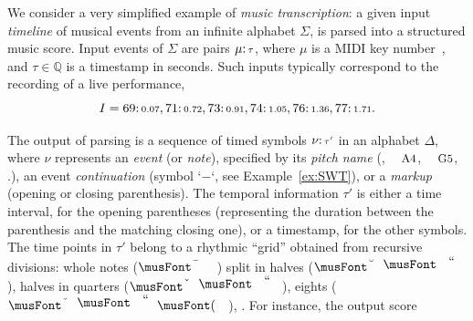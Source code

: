         
\begin{example}%
\label{ex:running}
We consider a very simplified %
example of \emph{music transcription}:
a given input \emph{timeline} of musical events
from an infinite alphabet $\Sigma$,
is parsed into a structured music score.
Input events of $\Sigma$
are pairs $\mu \mathpunct{:}{\scriptstyle \tau}$, where $\mu$ is a
MIDI key number~\cite{Selfridge-Field97beyondMIDI}, %
and $\tau \in \mathbb{Q}$ is a timestamp in seconds.
Such inputs typically correspond
to the recording of a live performance, \eg 
\[I = 69\mathpunct{:}{\scriptstyle 0.07},
      71\mathpunct{:}{\scriptstyle 0.72},
      73\mathpunct{:}{\scriptstyle 0.91},
	  74\mathpunct{:}{\scriptstyle 1.05},
	  76\mathpunct{:}{\scriptstyle 1.36},
	  77\mathpunct{:}{\scriptstyle 1.71}.\] %

The output of parsing is a sequence of
timed symbols $\nu\mathpunct{:}{\scriptstyle \tau'}$ in an alphabet $\Delta$,
where $\nu$  represents
an \emph{event} (or \emph{note}),
specified by its \emph{pitch name}
(\eg, $\mbox{\footnotesize A4}$, $\mbox{\footnotesize G5}$, \etc.),
an event \emph{continuation} (symbol `$-$`, see Example~\ref{ex:SWT}),
or a \emph{markup} (opening or closing parenthesis). %
The temporal information $\tau'$ 
is either a time interval, for the opening parentheses
(representing the duration between the parenthesis 
 and the matching closing one), 
or a timestamp, for the other symbols.
The time points in $\tau'$ belong to a rhythmic ``grid'' obtained from recursive divisions:
whole notes ($\musWhole$) split in halves ($\musHalf$), halves
in quarters ($\musQuarter$), eights ($\musEighth$), \etc.
%
For instance, the output score

\end{example}
